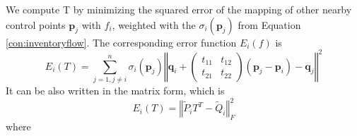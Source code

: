 \documentclass{article}
\begin{document}
We compute T by minimizing the squared error of the mapping of other nearby control points $\mathbf{p}_j$ with $f_i$, weighted with the $\sigma_i(\mathbf{p}_j)$ from Equation \eqref{con:inventoryflow}. The corresponding error function $E_i(f)$ is
\begin{equation}
    E_i(T)=\sum_{j=1,j\neq i}^n\sigma_i(\mathbf{p}_j)\left\Vert\mathbf{q}_i+\left(
    \begin{array}{cc}
        t_{11} & t_{12} \\
        t_{21} & t_{22}
    \end{array}\right)(\mathbf{p}_j-\mathbf{p}_i)-\mathbf{q}_j\right\Vert^2
\end{equation}
It can be also written in the matrix form, which is
\begin{equation}
    E_i(T)=\left\Vert \tilde{P}_i T^T-\tilde{Q}_i \right\Vert_F^2
\end{equation}
where
\end{document}
